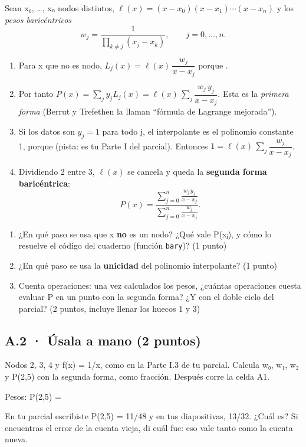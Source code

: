 Sean x₀, \ldots, xₙ nodos distintos, \(\ell(x) = (x-x_0)(x-x_1)\cdots(x-x_n)\) y los \emph{pesos baricéntricos}
\[ w_j = \frac{1}{\prod_{k\neq j}(x_j - x_k)}, \qquad j = 0, \ldots, n. \]

\begin{enumerate}
\def\labelenumi{\arabic{enumi}.}
\item Para x que no es nodo, \(L_j(x) = \ell(x)\,\dfrac{w_j}{x - x_j}\) porque .
\item Por tanto \(P(x) = \sum_j y_j L_j(x) = \ell(x)\,\sum_j \dfrac{w_j\,y_j}{x-x_j}\). Esta es la \emph{primera forma} (Berrut y Trefethen la llaman ``fórmula de Lagrange mejorada'').
\item Si los datos son \(y_j = 1\) para todo j, el interpolante es el polinomio constante 1, porque  (pista: es tu Parte I del parcial). Entonces \(1 = \ell(x)\,\sum_j \dfrac{w_j}{x-x_j}\).
\item Dividiendo 2 entre 3, \(\ell(x)\) se cancela y queda la \textbf{segunda forma baricéntrica}:
\[ P(x) = \frac{\displaystyle\sum_{j=0}^{n} \frac{w_j\,y_j}{x-x_j}}{\displaystyle\sum_{j=0}^{n} \frac{w_j}{x-x_j}}. \]
\end{enumerate}

\begin{enumerate}
\def\labelenumi{(\alph{enumi})}
\item ¿En qué paso se usa que x \textbf{no} es un nodo? ¿Qué vale P(xⱼ), y cómo lo resuelve el código del cuaderno (función \texttt{bary})? (1 punto)
\item ¿En qué paso se usa la \textbf{unicidad} del polinomio interpolante? (1 punto)
\item Cuenta operaciones: una vez calculados los pesos, ¿cuántas operaciones cuesta evaluar P en un punto con la segunda forma? ¿Y con el doble ciclo del parcial? (2 puntos, incluye llenar los huecos 1 y 3)
\end{enumerate}

\subsection{A.2 · Úsala a mano (2 puntos)}

Nodos 2, 3, 4 y f(x) = 1/x, como en la Parte I.3 de tu parcial. Calcula w₀, w₁, w₂ y P(2,5) con la segunda forma, como fracción. Después corre la celda A1.

Pesos:  \quad P(2,5) = 

En tu parcial escribiste P(2,5) = 11/48 y en tus diapositivas, 13/32. ¿Cuál es? Si encuentras el error de la cuenta vieja, di cuál fue: eso vale tanto como la cuenta nueva.

